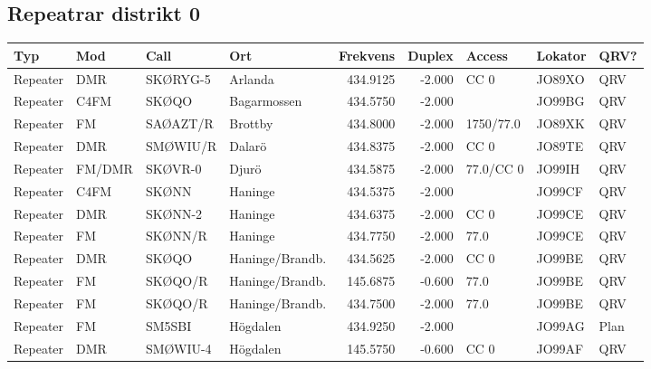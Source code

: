 \begin{landscape}

\subsection{Repeatrar distrikt 0}

\begin{longtable}{llllrrlll}
	\bf Typ  & \bf Mod     & \bf Call & \bf Ort         & \bf Frekvens & \bf Duplex & \bf Access & \bf Lokator & \bf QRV? \\ \hline
	\endhead
	Repeater & DMR         & SKØRYG-5 & Arlanda         &     434.9125 &     -2.000 & CC 0       & JO89XO      & QRV      \\
	Repeater & C4FM        & SKØQO    & Bagarmossen     &     434.5750 &     -2.000 &            & JO99BG      & QRV      \\
	Repeater & FM          & SAØAZT/R & Brottby         &     434.8000 &     -2.000 & 1750/77.0  & JO89XK      & QRV      \\
	Repeater & DMR         & SMØWIU/R & Dalarö          &     434.8375 &     -2.000 & CC 0       & JO89TE      & QRV      \\
	Repeater & FM/DMR      & SKØVR-0  & Djurö           &     434.5875 &     -2.000 & 77.0/CC 0  & JO99IH      & QRV      \\
	Repeater & C4FM        & SKØNN    & Haninge         &     434.5375 &     -2.000 &            & JO99CF      & QRV      \\
	Repeater & DMR         & SKØNN-2  & Haninge         &     434.6375 &     -2.000 & CC 0       & JO99CE      & QRV      \\
	Repeater & FM          & SKØNN/R  & Haninge         &     434.7750 &     -2.000 & 77.0       & JO99CE      & QRV      \\
	Repeater & DMR         & SKØQO    & Haninge/Brandb. &     434.5625 &     -2.000 & CC 0       & JO99BE      & QRV      \\
	Repeater & FM          & SKØQO/R  & Haninge/Brandb. &     145.6875 &     -0.600 & 77.0       & JO99BE      & QRV      \\
	Repeater & FM          & SKØQO/R  & Haninge/Brandb. &     434.7500 &     -2.000 & 77.0       & JO99BE      & QRV      \\
	Repeater & FM          & SM5SBI   & Högdalen        &     434.9250 &     -2.000 &            & JO99AG      & Plan     \\
	Repeater & DMR         & SMØWIU-4 & Högdalen        &     145.5750 &     -0.600 & CC 0       & JO99AF      & QRV      \\

\end{longtable}
\end{landscape}
